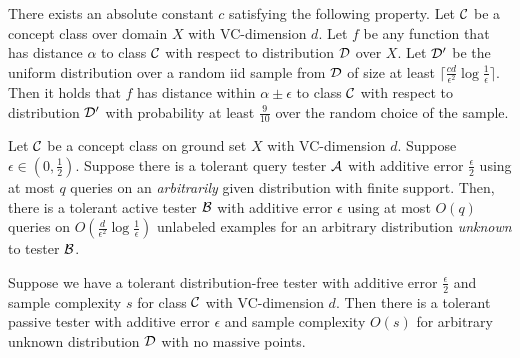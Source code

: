 \begin{lemma}
There exists an absolute constant $c$ satisfying the following property. Let ${\mathcal{C}}$ be a concept class over  domain $X$ with VC-dimension $d$. Let $f$ be any function that has distance $\alpha$ to class ${\mathcal{C}}$ with respect to distribution ${\mathcal{D}}$ over $X$. Let ${\mathcal{D}}'$ be the uniform distribution over a random iid sample from ${\mathcal{D}}$ of size at least $\lceil\frac{cd}{\epsilon^2}\log\frac{1}{\epsilon}\rceil$. Then it holds that $f$ has distance within $\alpha\pm\epsilon$ to class ${\mathcal{C}}$ with respect to distribution ${\mathcal{D}}'$ with probability at least $\frac{9}{10}$ over the random choice of the sample.
\end{lemma}

\begin{lemma}
\label{thm:reductiontoquery}
Let ${\mathcal{C}}$ be a concept class on ground set $X$ with VC-dimension $d$. Suppose $\epsilon\in (0,\frac{1}{2})$. Suppose there is a tolerant query tester ${\mathcal{A}}$ with additive error $\frac \epsilon 2$ using at most $q$ queries on an \emph{arbitrarily} given distribution with finite support. Then, there is a tolerant active tester ${\mathcal B}$ with additive error $\epsilon$ using at most $O(q)$ queries on $O(\frac{d}{\epsilon^2}\log\frac{1}{\epsilon})$ unlabeled examples for an arbitrary distribution \emph{unknown} to tester ${\mathcal B}$.
\end{lemma}

\begin{lemma}
\label{lm:distributionfreetolerant}
Suppose we have a tolerant distribution-free tester with additive error $\frac{\epsilon}{2}$ and sample complexity $s$ for class ${\mathcal{C}}$ with VC-dimension $d$. Then there is a tolerant passive tester with additive error $\epsilon$ and sample complexity $O(s)$ for arbitrary unknown distribution ${\mathcal{D}}$ with no massive points.
\end{lemma}




